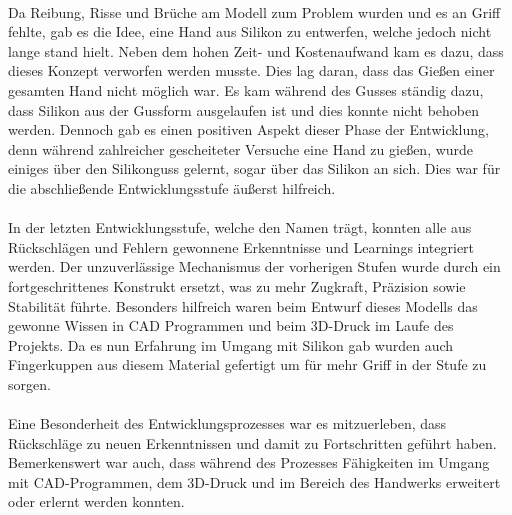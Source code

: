 \documentclass[titlepage,12pt,twoside]{article}
\begin{document}
\\
Da Reibung, Risse und Brüche am Modell zum Problem wurden und es an Griff fehlte, gab es die Idee, eine Hand aus Silikon zu entwerfen, welche jedoch nicht lange stand hielt. Neben dem hohen Zeit- und Kostenaufwand kam es dazu, dass dieses Konzept verworfen werden musste. Dies lag daran, dass das Gießen einer gesamten Hand nicht möglich war. Es kam während des Gusses ständig dazu, dass Silikon aus der Gussform ausgelaufen ist und dies konnte nicht behoben werden. 
Dennoch gab es einen positiven Aspekt dieser Phase der Entwicklung, denn während zahlreicher gescheiteter Versuche eine Hand zu gießen, wurde einiges über den Silikonguss gelernt, sogar über das Silikon an sich. Dies war für die abschließende Entwicklungsstufe äußerst hilfreich. \\
\\
In der letzten Entwicklungsstufe, welche den Namen  trägt, konnten alle aus Rückschlägen und Fehlern gewonnene Erkenntnisse und Learnings integriert werden. Der unzuverlässige Mechanismus der vorherigen Stufen wurde durch ein fortgeschrittenes Konstrukt ersetzt, was zu mehr Zugkraft, Präzision sowie Stabilität führte. Besonders hilfreich waren beim Entwurf dieses Modells das gewonne Wissen in CAD Programmen und beim 3D-Druck im Laufe des Projekts. Da es nun Erfahrung im Umgang mit Silikon gab wurden auch Fingerkuppen aus diesem Material gefertigt um für mehr Griff in der Stufe  zu sorgen. \\
\\
Eine Besonderheit des Entwicklungsprozesses war es mitzuerleben, dass Rückschläge zu neuen Erkenntnissen und damit zu Fortschritten geführt haben. Bemerkenswert war auch, dass während des Prozesses Fähigkeiten im Umgang mit CAD-Programmen, dem 3D-Druck und im Bereich des Handwerks erweitert oder erlernt werden konnten. \\
\\
\end{document}
